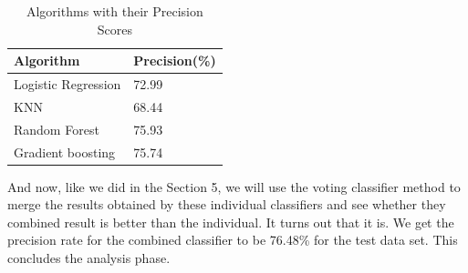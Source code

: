 \begin{table}[htb]
\centering
\caption{Algorithms with their Precision Scores}
\label{t:precisionscore}
\begin{tabular}{ll}
Algorithm & Precision(\%) \\
\hline
Logistic Regression & 72.99 \\
KNN & 68.44 \\
Random Forest & 75.93 \\
Gradient boosting & 75.74

\end{tabular}
\end{table}

And now, like we did in the Section 5, we will use the voting classifier method to merge the results obtained by these individual classifiers and see whether they combined result is better than the individual. It turns out that it is. We get the precision rate for the combined classifier to be 76.48\% for the test data set. This concludes the analysis phase.\\

